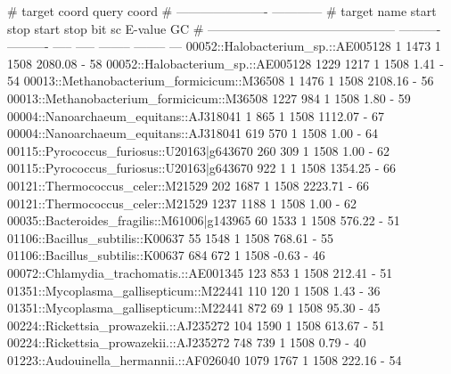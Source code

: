 \begin{sreoutputtiny}
#                                                          target coord   query coord                         
#                                                ----------------------  ------------                         
# target name                                         start        stop  start   stop    bit sc   E-value  GC%
# ---------------------------------------------  ----------  ----------  -----  -----  --------  --------  ---
  00052::Halobacterium_sp.::AE005128                      1        1473      1   1508   2080.08         -   58
  00052::Halobacterium_sp.::AE005128                   1229        1217      1   1508      1.41         -   54
  00013::Methanobacterium_formicicum::M36508              1        1476      1   1508   2108.16         -   56
  00013::Methanobacterium_formicicum::M36508           1227         984      1   1508      1.80         -   59
  00004::Nanoarchaeum_equitans::AJ318041                  1         865      1   1508   1112.07         -   67
  00004::Nanoarchaeum_equitans::AJ318041                619         570      1   1508      1.00         -   64
  00115::Pyrococcus_furiosus::U20163|g643670            260         309      1   1508      1.00         -   62
  00115::Pyrococcus_furiosus::U20163|g643670            922           1      1   1508   1354.25         -   66
  00121::Thermococcus_celer::M21529                     202        1687      1   1508   2223.71         -   66
  00121::Thermococcus_celer::M21529                    1237        1188      1   1508      1.00         -   62
  00035::Bacteroides_fragilis::M61006|g143965            60        1533      1   1508    576.22         -   51
  01106::Bacillus_subtilis::K00637                       55        1548      1   1508    768.61         -   55
  01106::Bacillus_subtilis::K00637                      684         672      1   1508     -0.63         -   46
  00072::Chlamydia_trachomatis.::AE001345               123         853      1   1508    212.41         -   51
  01351::Mycoplasma_gallisepticum::M22441               110         120      1   1508      1.43         -   36
  01351::Mycoplasma_gallisepticum::M22441               872          69      1   1508     95.30         -   45
  00224::Rickettsia_prowazekii.::AJ235272               104        1590      1   1508    613.67         -   51
  00224::Rickettsia_prowazekii.::AJ235272               748         739      1   1508      0.79         -   40
  01223::Audouinella_hermannii.::AF026040              1079        1767      1   1508    222.16         -   54

\end{sreoutputtiny}
